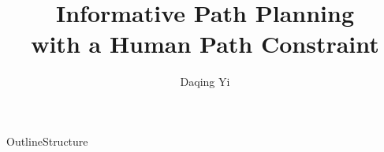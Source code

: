\documentclass{beamer}
\title{Informative Path Planning\\
with a Human Path Constraint}
\author{Daqing Yi 
}
\institute
{
  Department of Computer Science\\
  Brigham Young University
}
\date[]{}
\begin{document}
\begin{frame}
  \titlepage
\end{frame}

\begin{frame}{Outline}{Structure}
  \tableofcontents
\end{frame}













\end{document}
